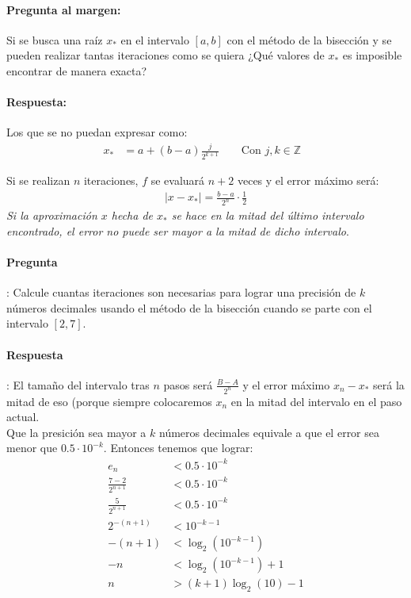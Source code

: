 \documentclass[spanish, fleqn]{article}
\begin{document}
\paragraph{\textbf{Pregunta al margen}:} Si se busca una raíz $x_*$ en el intervalo $[a,b]$ con el método de la bisección y se pueden realizar tantas iteraciones como se quiera ¿Qué valores de $x_*$ es imposible encontrar de manera exacta?
\paragraph{Respuesta:} Los que se no puedan expresar como:
\begin{align*}
x_*&= a+(b-a)\frac{j}{2^{k+1}} \qquad \text{Con $j,k \in \mathbb{Z}$ }
\end{align*}

Si se realizan $n$ iteraciones, $f$ se evaluará $n+2$ veces y el error máximo será:
\begin{align*}
|x-x_*|= \frac{b-a}{2^n}\cdot \frac{1}{2}
\end{align*}
\emph{Si la aproximación $x$ hecha de $x_*$ se hace en la mitad del último intervalo encontrado, el error no puede ser mayor a la mitad de dicho intervalo}.

\paragraph{Pregunta}: Calcule cuantas iteraciones son necesarias para lograr una precisión de $k$ números decimales usando el método de la bisección cuando se parte con el intervalo $[2,7]$.
\paragraph{Respuesta}: El tamaño del intervalo tras $n$ pasos será $\frac{B-A}{2^n}$ y el error máximo $x_n-x_*$ será la mitad de eso (porque siempre colocaremos $x_n$ en la mitad del intervalo en el paso actual.
\\ Que la presición sea mayor a $k$ números decimales equivale a que el error sea menor que $0.5\cdot 10^{-k}$. Entonces tenemos que lograr:
\begin{align*}
e_{n} &< 0.5\cdot 10^{-k}
\\\frac{7-2}{2^{n+1}} &< 0.5 \cdot 10^{-k}
\\\frac{5}{2^{n+1}} &< 0.5 \cdot 10^{-k}
\\2^{-(n+1)} &< 10^{-k-1}
\\ -(n+1) &< \log_2(10^{-k-1})
\\ -n &< \log_2(10^{-k-1})+1
\\ n &> (k+1)\log_2(10)-1
\end{align*}
\end{document}
